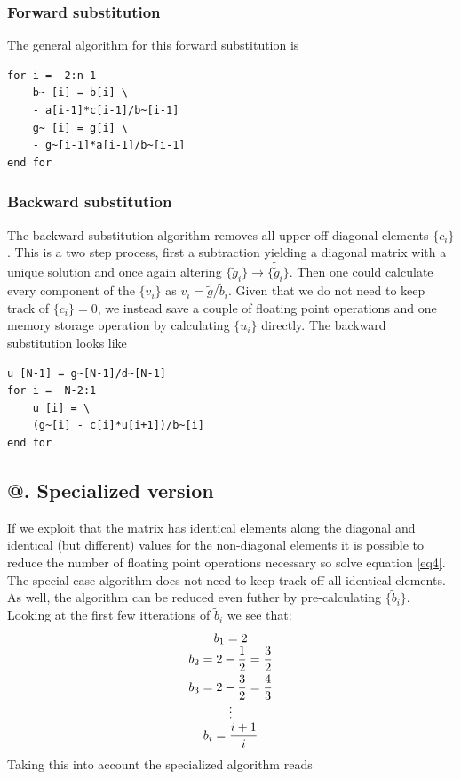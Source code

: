 \documentclass[%
reprint,
amsmath,amssymb,
aps,
]{revtex4-1}
\makeatletter
\newcommand*{\rom}[1]{\expandafter\@slowromancap\romannumeral #1@}
\makeatother
\begin{document}
\subsubsection{Forward substitution}
\noindent The general algorithm for this forward substitution is

\begin{lstlisting}[basicstyle=\ttfamily]
for i =  2:n-1
	b~ [i] = b[i] \
	- a[i-1]*c[i-1]/b~[i-1]
	g~ [i] = g[i] \
	- g~[i-1]*a[i-1]/b~[i-1]             
end for
\end{lstlisting} 


\subsubsection{Backward substitution}
\noindent The backward substitution algorithm removes all upper off-diagonal elements $\{c_i\}$. This is a two step process, first a subtraction yielding a diagonal matrix with a unique solution and once again altering $\{\tilde{g}_i\} \rightarrow \{\tilde{\tilde{g}}_i\}$. Then one could calculate every component of the $\{v_i\}$ as $v_i = \tilde{g}/\tilde{b}_i$. Given that we do not need to keep track of $\{c_i\} = 0$, we instead save a couple of floating point operations and one memory storage operation by calculating $\{u_i\}$ directly. The backward substitution looks like

\begin{lstlisting}[basicstyle=\ttfamily]
u [N-1] = g~[N-1]/d~[N-1]
for i =  N-2:1
	u [i] = \
	(g~[i] - c[i]*u[i+1])/b~[i]             
end for
\end{lstlisting} 

\subsection*{\rom{3}. Specialized version}
\noindent If we exploit that the matrix has identical elements along the diagonal and identical (but different) values for the non-diagonal elements it is possible to reduce the number of floating point operations necessary so solve equation \ref{eq4}.  The special case algorithm does not need to keep track off all identical elements. As well, the algorithm can be reduced even futher by pre-calculating $\{\tilde{b}_i\}$. Looking at the first few itterations of $\tilde{b}_i$ we see that:
\begin{equation}
\begin{matrix}
b_1 = 2 \\
\vspace{1mm}
b_2 = 2 - \dfrac{1}{2} = \dfrac{3}{2} \\
b_3 = 2 - \dfrac{3}{2} = \dfrac{4}{3} \\
\vdots \\
b_i = \dfrac{i + 1}{i}
\end{matrix}
\nonumber
\end{equation}
Taking this into account the specialized algorithm reads 
\end{document}
